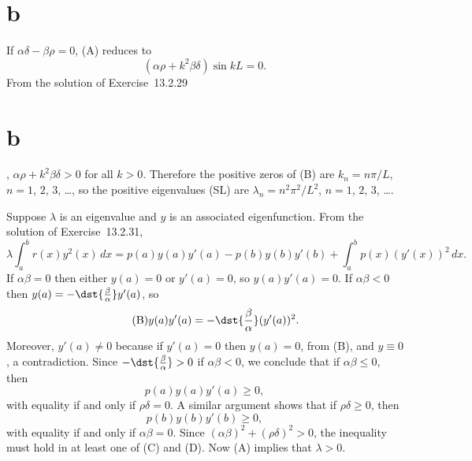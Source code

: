 \documentclass[dvips]{book}
\renewcommand{\exer}[1]{\par\medskip\;\noindent{\color{red}\bf #1.}}
\numberwithin{example}{section}
\numberwithin{equation}{section}
\numberwithin{theorem}{section}
\numberwithin{table}{section}
\numberwithin{figure}{section}
\begin{document}
\part{b}
If $\alpha\delta-\beta\rho=0$, (A) reduces to
\begin{equation} \tag{B}
(\alpha\rho+k^{2}\beta\delta)\sin kL=0.
\end{equation}
From the solution of Exercise~13.2.29\part{b},
$\alpha\rho+k^{2}\beta\delta>0$
for all $k>0$. Therefore the positive zeros of (B) are
$k_{n}=n\pi/L$, $n=1$, $2$, $3$, \dots, so the positive
eigenvalues (SL) are   $\lambda_{n}=n^{2}\pi^{2}/L^{2}$, $n=1$, $2$, $3$,
\dots.



\exer{13.2.32}
Suppose $\lambda$ is an eigenvalue and $y$ is an associated eigenfunction.
From the solution of Exercise~13.2.31,
\begin{equation} \tag{A}
\lambda\int_{a}^{b}r(x)y^{2}(x)\,dx
=p(a)y(a)y'(a)-p(b)y(b)y'(b)+
\int_{a}^{b}p(x)(y'(x))^{2}\,dx.
\end{equation}
If $\alpha\beta=0$ then either $y(a)=0$ or $y'(a)=0$, so $y(a)y'(a)=0$.
If $\alpha\beta<0$ then $y(a)=-\dst{\frac{\beta}{\alpha}}y'(a)$, so
\begin{equation} \tag{B}
y(a)y'(a)=-\dst{\frac{\beta}{\alpha}}(y'(a))^{2}.
\end{equation}
Moreover, $y'(a)\ne0$ because if $y'(a)=0$ then $y(a)=0$, from (B), and
$y\equiv0$, a contradiction. Since $-\dst{\frac{\beta}{\alpha}}>0$
if $\alpha\beta<0$, we conclude that if $\alpha\beta\le 0$, then
\begin{equation}  \tag{C}
p(a)y(a)y'(a)\ge 0,
\end{equation}
with equality if and only if $\rho\delta=0$.
A similar argument shows that if $\rho\delta\ge 0$, then
\begin{equation} \tag{D}
p(b)y(b)y'(b)\ge 0,
\end{equation}
with equality if and only if $\alpha\beta=0$.
Since
 $(\alpha\beta)^{2}+(\rho\delta)^{2}>0$, the inequality must hold in at
least one of (C) and (D). Now (A) implies that $\lambda>0$.
\end{document}
